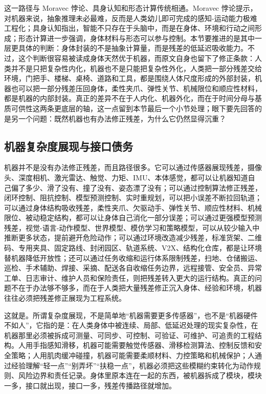 这一路径与 Moravec 悖论、具身认知和形态计算传统相通\cite{moravec1988,pfeifer2007,varela1991,gibsonpick2000,pfeiferbongard2006,hauser2011}。Moravec 悖论提示，对机器来说，抽象推理未必最难，反而是人类幼儿即可完成的感知-运动能力极难工程化；具身认知指出，智能不只存在于头脑中，而是在身体、环境和行动之间形成；形态计算进一步强调，身体材料与形态可以参与控制。本节要推进的是其中一层更具体的判断：身体封装的不是抽象计算量，而是残差的低延迟吸收能力。不过，这个判断很容易被读成身体天然优于机器，而原文自身也留下了修正条款：人类并不是只把复杂性内化，机器也不是只能把复杂性外化，人类把一部分残差交给环境，门把手、楼梯、桌椅、道路和工具，都是围绕人体尺度形成的外部封装，机器也可以把一部分残差压回身体，柔性夹爪、弹性关节、机械限位和顺应性材料，都是机器的内部封装。真正的差异不在于人内化、机器外化，而在于时间分母与基质可供性这两条更底层的轴，这一点留到本节最后一个小节处理；眼下要先回答的是另一个问题：既然机器也有办法修正残差，为什么它仍然显得沉重？

\subsection{机器复杂度展现与接口债务}


机器并不是没有办法修正残差，而且路径很多。它可以通过传感器展现残差，摄像头、深度相机、激光雷达、触觉、力矩、IMU、本体感觉，都可以让机器知道自己偏了多少、滑了没有、撞了没有、姿态漂了没有；可以通过控制算法修正残差，闭环控制、阻抗控制、模型预测控制、实时重规划，可以把小误差不断拉回轨道；可以通过身体结构吸收残差，柔性夹爪、欠驱动手、弹性关节、顺应性材料、机械限位、被动稳定结构，都可以让身体自己消化一部分误差\cite{mason1985,birglen2008}；可以通过更强模型预测残差，视觉-语言-动作模型、世界模型、模仿学习和策略模型，可以从较少输入中推断更多状态，提前避开危险动作\cite{shao2025,li2025}；可以通过环境改造减少残差，标准货架、二维码、专用夹具、固定路线、封闭园区、轨道系统、V2X、结构化仓库，都是让环境替机器降低开放性；还可以通过任务收缩和运行体系限制残差，扫地、仓储搬运、巡检、手术辅助、焊接、采摘、配送各自收缩任务边界，远程接管、安全员、异常工单、日志审计、维护人员和保险责任，则把残差转入更大的运行结构。真正的问题不在于办法够不够多，而在于人类把大量残差修正沉入身体、经验和环境，机器往往必须把残差修正展现为工程系统。

这就是。所谓复杂度展现，不是简单地“机器需要更多传感器”，也不是“机器硬件不如人”，它指的是：在人类身体中被连续、局部、低延迟处理的现实复杂性，在机器那里必须被拆成可测量、可同步、可控制、可验证、可维护、可追责的工程结构。人用手指感知滑移，机器可能需要触觉传感器、滑移检测算法、控制反馈和安全策略；人用肌肉缓冲碰撞，机器可能需要柔顺材料、力控策略和机械保护；人通过经验理解“轻一点”“别弄坏”“扶稳一点”，机器必须把这些模糊约束转化为动作规则、风险边界和责任记录。身体里原本连在一起的东西，被机器拆成了模块，模块一多，接口就出现，接口一多，残差传播路径就增加。

